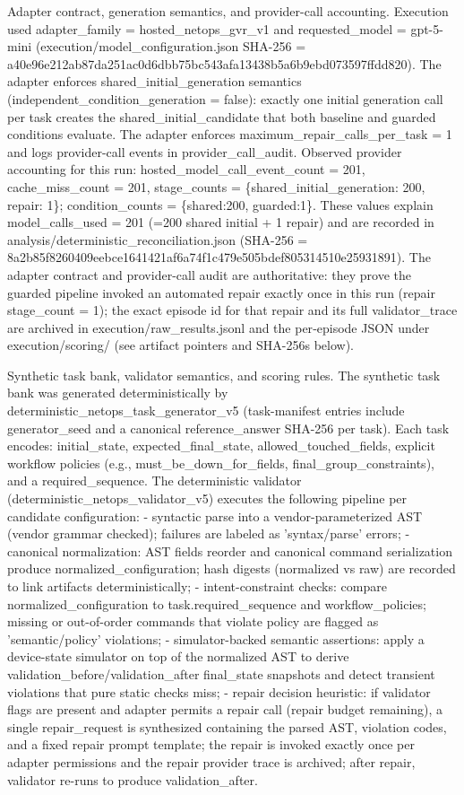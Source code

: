 \documentclass[conference]{IEEEtran}
\begin{document}
Adapter contract, generation semantics, and provider-call accounting. Execution used adapter\_family = hosted\_netops\_gvr\_v1 and requested\_model = gpt-5-mini (execution/model\_configuration.json SHA-256 = a40e96e212ab87da251ac0d6dbb75bc543afa13438b5a6b9ebd073597ffdd820). The adapter enforces shared\_initial\_generation semantics (independent\_condition\_generation = false): exactly one initial generation call per task creates the shared\_initial\_candidate that both baseline and guarded conditions evaluate. The adapter enforces maximum\_repair\_calls\_per\_task = 1 and logs provider-call events in provider\_call\_audit. Observed provider accounting for this run: hosted\_model\_call\_event\_count = 201, cache\_miss\_count = 201, stage\_counts = \{shared\_initial\_generation: 200, repair: 1\}; condition\_counts = \{shared:200, guarded:1\}. These values explain model\_calls\_used = 201 (=200 shared initial + 1 repair) and are recorded in analysis/deterministic\_reconciliation.json (SHA-256 = 8a2b85f8260409eebce1641421af6a74f1c479e505bdef805314510e25931891). The adapter contract and provider-call audit are authoritative: they prove the guarded pipeline invoked an automated repair exactly once in this run (repair stage\_count = 1); the exact episode id for that repair and its full validator\_trace are archived in execution/raw\_results.jsonl and the per‑episode JSON under execution/scoring/ (see artifact pointers and SHA-256s below).

Synthetic task bank, validator semantics, and scoring rules. The synthetic task bank was generated deterministically by deterministic\_netops\_task\_generator\_v5 (task-manifest entries include generator\_seed and a canonical reference\_answer SHA-256 per task). Each task encodes: initial\_state, expected\_final\_state, allowed\_touched\_fields, explicit workflow policies (e.g., must\_be\_down\_for\_fields, final\_group\_constraints), and a required\_sequence. The deterministic validator (deterministic\_netops\_validator\_v5) executes the following pipeline per candidate configuration:
- syntactic parse into a vendor-parameterized AST (vendor grammar checked); failures are labeled as 'syntax/parse' errors;
- canonical normalization: AST fields reorder and canonical command serialization produce normalized\_configuration; hash digests (normalized vs raw) are recorded to link artifacts deterministically;
- intent-constraint checks: compare normalized\_configuration to task.required\_sequence and workflow\_policies; missing or out-of-order commands that violate policy are flagged as 'semantic/policy' violations;
- simulator-backed semantic assertions: apply a device-state simulator on top of the normalized AST to derive validation\_before/validation\_after final\_state snapshots and detect transient violations that pure static checks miss;
- repair decision heuristic: if validator flags are present and adapter permits a repair call (repair budget remaining), a single repair\_request is synthesized containing the parsed AST, violation codes, and a fixed repair prompt template; the repair is invoked exactly once per adapter permissions and the repair provider trace is archived; after repair, validator re-runs to produce validation\_after.
\end{document}
